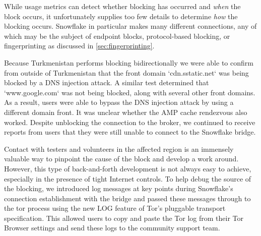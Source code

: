 \documentclass[letterpaper,twocolumn]{article}
\begin{document}
While usage metrics can detect whether blocking has occurred and \emph{when} the block occurs, 
it unfortunately supplies too few details to determine \emph{how} the blocking occurs. 
Snowflake in particular makes many different connections, any of which may be the subject of endpoint blocks, 
protocol-based blocking, or fingerprinting as discussed in \autoref{sec:fingerprinting}.

Because Turkmenistan performs blocking bidirectionally
we were able to confirm from outside of Turkmenistan 
that the front domain `cdn.sstatic.net` was being blocked by a DNS injection attack.
A similar test determined that `www.google.com` was not being blocked, along with several other front domains.
As a result, users were able to bypass the DNS injection attack 
by using a different domain front. It was unclear whether the AMP cache rendezvous also worked.
Despite unblocking the connection to the broker, we continued to receive reports from users that they were still unable to 
connect to the Snowflake bridge.

Contact with
testers and volunteers in the affected region is an immensely valuable
way to pinpoint the cause of the block and develop a work around. However, this type of back-and-forth 
development is not always easy to achieve, especially in the presence of tight Internet controls.
To help debug the source of the blocking, we introduced log messages at key points during Snowflake's
connection establishment with the bridge and passed these messages through to the tor process using
the new LOG feature of Tor's pluggable transport specification.
This allowed users to copy and paste the Tor log from their Tor Browser settings and send these logs
to the community support team.
\end{document}
